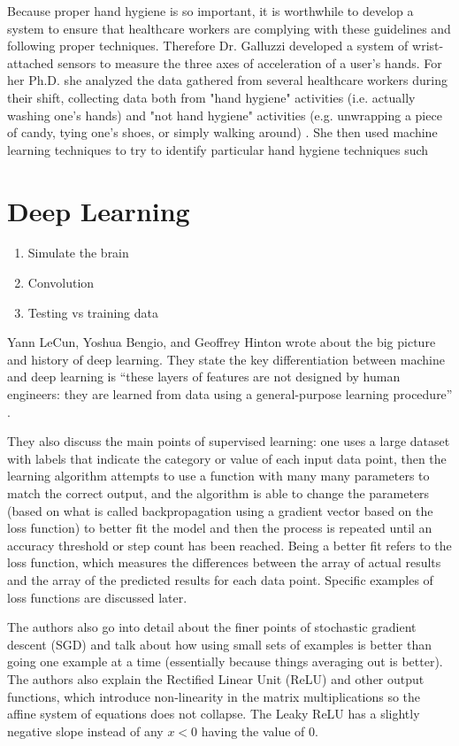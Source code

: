 \documentclass[]{report}
\begin{document}
Because proper hand hygiene is so important, it is worthwhile to develop a system to ensure that healthcare workers are complying with these guidelines and following proper techniques. Therefore Dr. Galluzzi developed a system of wrist-attached sensors to measure the three axes of acceleration of a user's hands. For her Ph.D. she analyzed the data gathered from several healthcare workers during their shift, collecting data both from "hand hygiene" activities (i.e. actually washing one's hands) and "not hand hygiene" activities (e.g. unwrapping a piece of candy, tying one's shoes, or simply walking around) \cite{Galluzzi}. She then used machine learning techniques to try to identify particular hand hygiene techniques such 

\section{Deep Learning}
\begin{enumerate}
	\item Simulate the brain
	\item Convolution
	\item Testing vs training data
\end{enumerate}


Yann LeCun, Yoshua Bengio, and Geoffrey Hinton wrote about the big picture and history of deep learning. They state the key differentiation between machine and deep learning is “these layers of features are not designed by human engineers: they are learned from data using a general-purpose learning procedure” \cite{ThreeGiants}. 

They also discuss the main points of supervised learning: one uses a large dataset with labels that indicate the category or value of each input data point, then the learning algorithm attempts to use a function with many many parameters to match the correct output, and the algorithm is able to change the parameters (based on what is called backpropagation using a gradient vector based on the loss function) to better fit the model and then the process is repeated until an accuracy threshold or step count has been reached. Being a better fit refers to the loss function, which measures the differences between the array of actual results and the array of the predicted results for each data point. Specific examples of loss functions are discussed later.

The authors also go into detail about the finer points of stochastic gradient descent (SGD) and talk about how using small sets of examples is better than going one example at a time (essentially because things averaging out is better). The authors also explain the Rectified Linear Unit (ReLU) and other output functions, which introduce non-linearity in the matrix multiplications so the affine system of equations does not collapse. The Leaky ReLU has a slightly negative slope instead of any $x < 0$ having the value of $0$.
\end{document}
